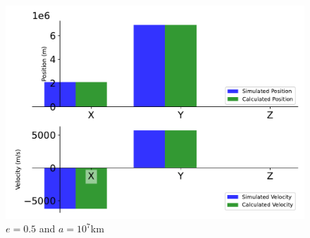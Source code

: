 \begin{figure}[htbp]\centerline{\includegraphics[height=0.7\textwidth, keepaspectratio]{AutoTeX/EquEllip_a_1}}\caption{$e = 0.5$ and $a = 10^7$km}\label{fig:EquEllip_a_1}\end{figure}